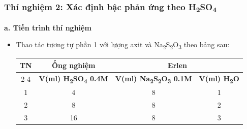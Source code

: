 \subsubsection{Thí nghiệm 2: Xác định bậc phản ứng theo H\textsubscript{2}SO\textsubscript{4}}
\textbf{a. Tiến trình thí nghiệm}
\begin{itemize}
    \item Thao tác tương tự phần 1 với lượng axit và Na\textsubscript{2}S\textsubscript{2}O\textsubscript{3} theo bảng sau:
    \begin{table}[H]
        \centering
        \begin{tabular}{|c|c|c|c|}
            \hline
            \multirow{2}{*}{\textbf{TN}} & \textbf{Ống nghiệm} & \multicolumn{2}{c|}{\textbf{Erlen}} \\
            \cline{2-4}
            & \textbf{V(ml) H\textsubscript{2}SO\textsubscript{4} 0.4M} & \textbf{V(ml) Na\textsubscript{2}S\textsubscript{2}O\textsubscript{3} 0.1M} & \textbf{V(ml) H\textsubscript{2}O} \\
            \hline
            1 & 4 & 8 & 1 \\
            \hline
            2 & 8 & 8 & 2 \\
            \hline
            3 & 16 & 8 & 3 \\
            \hline
        \end{tabular}
    \end{table}
\end{itemize}

